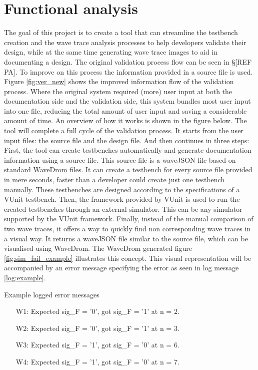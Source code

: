 \chapter{Functional analysis} \label{FA}
The goal of this project is to create a tool that can streamline the testbench creation and the wave trace analysis processes to help developers validate their design, while at the same time generating wave trace images to aid in documenting a design. The original validation process flow can be seen in §[REF PA]. To improve on this process the information provided in a source file is used. Figure \ref{fig:ver_new} shows the improved information flow of the validation process. Where the original system required (more) user input at both the documentation side and the validation side, this system bundles most user input into one file, reducing the total amount of user input and saving a considerable amount of time. An overview of how it works is shown in the figure below.\nline
{}\nline
The tool will complete a full cycle of the validation process. It starts from the user input files: the source file and the design file. And then continues in three steps:
\npar
First, the tool can create testbenches automatically and generate documentation information using a source file. This source file is a waveJSON file based on standard WaveDrom \cite{wavedrom} files. It can create a testbench for every source file provided in mere seconds, faster than a developer could create just one testbench manually. These testbenches are designed according to the specifications of a VUnit \cite{vunit} testbench.\newpage
\npar
Then, the framework provided by VUnit is used to run the created testbenches through an external simulator. This can be any simulator supported by the VUnit framework.
\npar
Finally, instead of the manual comparison of two wave traces, it offers a way to quickly find non corresponding wave traces in a visual way. It returns a waveJSON file similar to the source file, which can be visualised using WaveDrom. The WaveDrom generated figure \ref{fig:sim_fail_example} illustrates this concept. This visual representation will be accompanied by an error message specifying the error as seen in log message \ref{log:example}.\nline
{}\newpage
\begin{customenv}
	\caption{Example logged error messages}\label{log:example}
	\begin{itemize}
		\item [W1:] Expected sig\_F =  '0',  got sig\_F =  '1' at n = 2.
		\item [W2:] Expected sig\_F =  '0',  got sig\_F =  '1' at n = 3.
		\item [W3:] Expected sig\_F =  '1',  got sig\_F =  '0' at n = 6.
		\item [W4:] Expected sig\_F =  '1',  got sig\_F =  '0' at n = 7.
	\end{itemize}
\end{customenv}\newpage\nline

